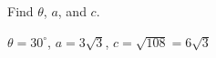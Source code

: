 {Find $\theta$, $a$, and $c$. 

\begin{center}
\end{center}}
{$\theta = 30^{\circ}$, $a = 3\sqrt{3}$, $c = \sqrt{108} = 6\sqrt{3}$}
